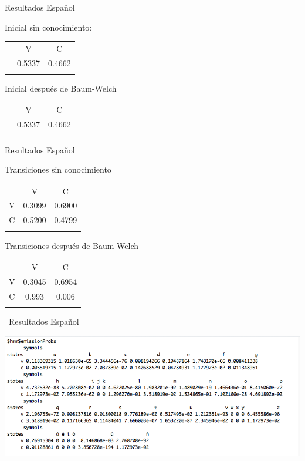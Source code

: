 \documentclass[ignorenonframetext,]{beamer}
\begin{document}
\begin{frame}{Resultados Español}

Inicial sin conocimiento:

\begin{longtable}[c]{@{}ccc@{}}
\toprule\addlinespace
& V & C
\\\addlinespace
\midrule\endhead
& 0.5337 & 0.4662
\\\addlinespace
\bottomrule
\end{longtable}

Inicial después de Baum-Welch

\begin{longtable}[c]{@{}ccc@{}}
\toprule\addlinespace
& V & C
\\\addlinespace
\midrule\endhead
& 0.5337 & 0.4662
\\\addlinespace
\bottomrule
\end{longtable}

\end{frame}

\begin{frame}{Resultados Español}

Transiciones sin conocimiento

\begin{longtable}[c]{@{}ccc@{}}
\toprule\addlinespace
& V & C
\\\addlinespace
\midrule\endhead
V & 0.3099 & 0.6900
\\\addlinespace
C & 0.5200 & 0.4799
\\\addlinespace
\bottomrule
\end{longtable}

Transiciones después de Baum-Welch

\begin{longtable}[c]{@{}ccc@{}}
\toprule\addlinespace
& V & C
\\\addlinespace
\midrule\endhead
V & 0.3045 & 0.6954
\\\addlinespace
C & 0.993 & 0.006
\\\addlinespace
\bottomrule
\end{longtable}

\end{frame}

\begin{frame}{~Resultados Español}

\includegraphics{../hmm/salida_vocales.png}

\end{frame}
\end{document}
